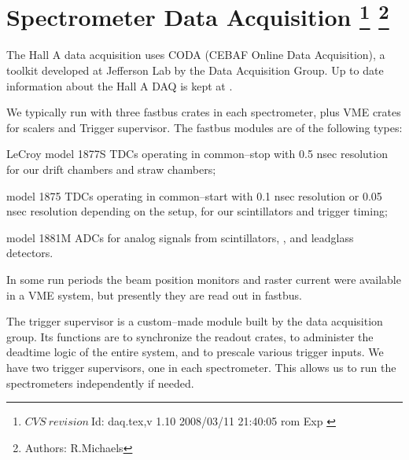 \chapter[Spectrometer Data Acquisition]{Spectrometer Data Acquisition
\footnote{
  $CVS~revision~ $Id: daq.tex,v 1.10 2008/03/11 21:40:05 rom Exp $ $
}
\footnote{Authors: R.Michaels }
}




\par
The Hall A data acquisition uses CODA\cite{CODAwww}
(CEBAF Online Data Acquisition), a toolkit
developed at Jefferson Lab by the Data
Acquisition Group. 
Up to date information about the Hall A DAQ
is kept at 
.

\par
We typically run with three fastbus crates in
each spectrometer, plus VME crates for scalers and Trigger supervisor.
The fastbus modules are of the following
types:
\begin{list}{.~}{\setlength{\itemsep}{-0.15cm}}
  \item LeCroy model
    1877S TDCs operating in common--stop with 0.5 nsec
    resolution for our drift chambers and
    straw chambers; 
  \item model 1875 TDCs operating in common--start with 0.1 nsec resolution
      or 0.05 nsec resolution depending on the setup,
      for our scintillators and trigger timing;
  \item model 1881M ADCs for analog signals from scintillators, 
        \Cherenkov{}, and leadglass detectors.
\end{list}
In some run periods the beam position monitors
and raster current were available in a VME system,
but presently they are read out in fastbus.

\par
The trigger supervisor is a custom--made
module built by the data
acquisition group.  Its functions are to
synchronize the readout crates, to administer
the deadtime logic of the entire system, and
to prescale various trigger inputs.  
We have two trigger supervisors,
one in each spectrometer.  This allows us to
run the spectrometers independently if needed.

